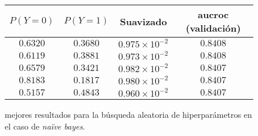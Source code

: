 \vspace{0.5em}
\begin{figure}[!htbp]
    \begin{center}
        \begin{tabular}{ |c|c|c|c| } 
         \hline
        $P(Y=0)$ & $P(Y=1)$ & Suavizado & aucroc (validación) \\
        \hline
        $0.6320$ & $0.3680$ & $0.975 \times 10^{-2}$ & $0.8408$ \\ 
        $0.6119$ & $0.3881$ & $0.973 \times 10^{-2}$ & $0.8408$  \\
        $0.6579$ & $0.3421$ & $0.982 \times 10^{-2}$ & $0.8407$  \\ 
        $0.8183$ & $0.1817$ & $0.980 \times 10^{-2}$ & $0.8407$  \\
        $0.5157$ & $0.4843$ & $0.960 \times 10^{-2}$ & $0.8407$  \\ 
        \hline
        \end{tabular}
    \end{center}
    \caption{mejores resultados para la búsqueda aleatoria de hiperparámetros en el caso de \textit{naïve bayes}.} \label{naive_bayes}
\end{figure}

